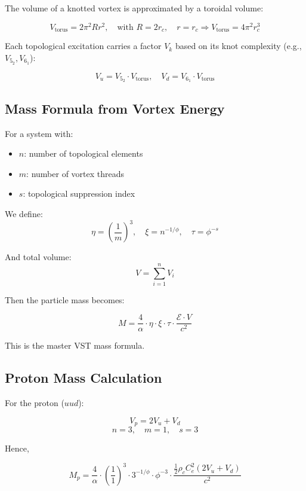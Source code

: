 \documentclass[11pt]{article}
\begin{document}
    The volume of a knotted vortex is approximated by a toroidal volume:

    \[
        V_{\text{torus}} = 2\pi^2 R r^2, \quad \text{with } R = 2r_c, \quad r = r_c \Rightarrow V_{\text{torus}} = 4\pi^2 r_c^3
    \]

    Each topological excitation carries a factor \( V_k \) based on its knot complexity (e.g., \( V_{5_2}, V_{6_1} \)):

    \[
        V_u = V_{5_2} \cdot V_{\text{torus}}, \quad V_d = V_{6_1} \cdot V_{\text{torus}}
    \]

    \subsection{Mass Formula from Vortex Energy}

    For a system with:
    \begin{itemize}
        \item \( n \): number of topological elements
        \item \( m \): number of vortex threads
        \item \( s \): topological suppression index
    \end{itemize}

    We define:
    \[
        \eta = \left( \frac{1}{m} \right)^3, \quad
        \xi = n^{-1/\phi}, \quad
        \tau = \phi^{-s}
    \]

    And total volume:
    \[
        V = \sum_{i=1}^{n} V_i
    \]

    Then the particle mass becomes:

    \[
        M = \frac{4}{\alpha} \cdot \eta \cdot \xi \cdot \tau \cdot \frac{\mathcal{E} \cdot V}{c^2}
    \]

    This is the master VST mass formula.

    \subsection{Proton Mass Calculation}

    For the proton (\( uud \)):

    \[
        V_p = 2 V_u + V_d
    \]
    \[
        n = 3, \quad m = 1, \quad s = 3
    \]

    Hence,

    \[
        M_p = \frac{4}{\alpha} \cdot \left( \frac{1}{1} \right)^3 \cdot 3^{-1/\phi} \cdot \phi^{-3} \cdot \frac{\frac{1}{2} \rho_c C_e^2 (2 V_u + V_d)}{c^2}
    \]
\end{document}
